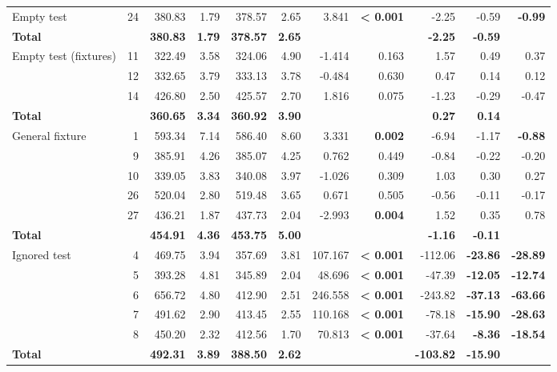 \begin{xltabular}{\linewidth}{l r r r r r r r r r r}
  \midrule
    Empty test & 24 & 380.83 & 1.79 & 378.57 & 2.65 & 3.841 & \textbf{< 0.001} & -2.25 & -0.59 & \textbf{-0.99} \\
    \textbf{Total} & & \textbf{380.83} & \textbf{1.79} & \textbf{378.57} & \textbf{2.65} & & & \textbf{-2.25} & \textbf{-0.59} & \\
  \midrule
    Empty test (fixtures) & 11 & 322.49 & 3.58 & 324.06 & 4.90 & -1.414 & 0.163 & 1.57 & 0.49 & 0.37 \\
     & 12 & 332.65 & 3.79 & 333.13 & 3.78 & -0.484 & 0.630 & 0.47 & 0.14 & 0.12 \\
     & 14 & 426.80 & 2.50 & 425.57 & 2.70 & 1.816 & 0.075 & -1.23 & -0.29 & -0.47 \\
    \textbf{Total} & & \textbf{360.65} & \textbf{3.34} & \textbf{360.92} & \textbf{3.90} & & & \textbf{0.27} & \textbf{0.14} & \\
  \midrule
    General fixture & 1 & 593.34 & 7.14 & 586.40 & 8.60 & 3.331 & \textbf{0.002} & -6.94 & -1.17 & \textbf{-0.88} \\
     & 9 & 385.91 & 4.26 & 385.07 & 4.25 & 0.762 & 0.449 & -0.84 & -0.22 & -0.20 \\
     & 10 & 339.05 & 3.83 & 340.08 & 3.97 & -1.026 & 0.309 & 1.03 & 0.30 & 0.27 \\
     & 26 & 520.04 & 2.80 & 519.48 & 3.65 & 0.671 & 0.505 & -0.56 & -0.11 & -0.17 \\
     & 27 & 436.21 & 1.87 & 437.73 & 2.04 & -2.993 & \textbf{0.004} & 1.52 & 0.35 & 0.78 \\
    \textbf{Total} & & \textbf{454.91} & \textbf{4.36} & \textbf{453.75} & \textbf{5.00} & & & \textbf{-1.16} & \textbf{-0.11} & \\
  \midrule
    Ignored test & 4 & 469.75 & 3.94 & 357.69 & 3.81 & 107.167 & \textbf{< 0.001} & -112.06 & \textbf{-23.86} & \textbf{-28.89} \\
     & 5 & 393.28 & 4.81 & 345.89 & 2.04 & 48.696 & \textbf{< 0.001} & -47.39 & \textbf{-12.05} & \textbf{-12.74} \\
     & 6 & 656.72 & 4.80 & 412.90 & 2.51 & 246.558 & \textbf{< 0.001} & -243.82 & \textbf{-37.13} & \textbf{-63.66} \\
     & 7 & 491.62 & 2.90 & 413.45 & 2.55 & 110.168 & \textbf{< 0.001} & -78.18 & \textbf{-15.90} & \textbf{-28.63} \\
     & 8 & 450.20 & 2.32 & 412.56 & 1.70 & 70.813 & \textbf{< 0.001} & -37.64 & \textbf{-8.36} & \textbf{-18.54} \\
    \textbf{Total} & & \textbf{492.31} & \textbf{3.89} & \textbf{388.50} & \textbf{2.62} & & & \textbf{-103.82} & \textbf{-15.90} & \\

\end{xltabular}
